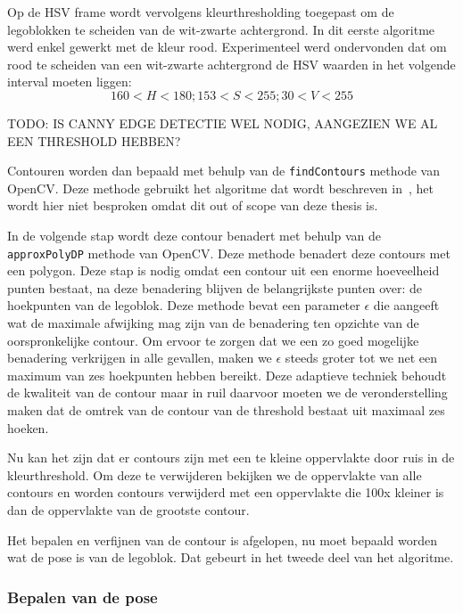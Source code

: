 Op de HSV frame wordt vervolgens kleurthresholding toegepast om de legoblokken te scheiden van de wit-zwarte achtergrond. In dit eerste algoritme werd enkel gewerkt met de kleur rood. Experimenteel werd ondervonden dat om rood te scheiden van een wit-zwarte achtergrond de HSV waarden in het volgende interval moeten liggen:
$$ 160 < H < 180; 153 < S < 255; 30 < V < 255$$

TODO: IS CANNY EDGE DETECTIE WEL NODIG, AANGEZIEN WE AL EEN THRESHOLD HEBBEN? %

Contouren worden dan bepaald met behulp van de \texttt{findContours} methode van OpenCV. Deze methode gebruikt het algoritme dat wordt beschreven in~\cite{suzuki1985topological}, het wordt hier niet besproken omdat dit out of scope van deze thesis is.

In de volgende stap wordt deze contour benadert met behulp van de \texttt{approxPolyDP} methode van OpenCV. Deze methode benadert deze contours met een polygon. Deze stap is nodig omdat een contour uit een enorme hoeveelheid punten bestaat, na deze benadering blijven de belangrijkste punten over: de hoekpunten van de legoblok. Deze methode bevat een parameter $\epsilon$ die aangeeft wat de maximale afwijking mag zijn van de benadering ten opzichte van de oorspronkelijke contour. Om ervoor te zorgen dat we een zo goed mogelijke benadering verkrijgen in alle gevallen, maken we $\epsilon$ steeds groter tot we net een maximum van zes hoekpunten hebben bereikt. Deze adaptieve techniek behoudt de kwaliteit van de contour maar in ruil daarvoor moeten we de veronderstelling maken dat de omtrek van de contour van de threshold bestaat uit maximaal zes hoeken.

Nu kan het zijn dat er contours zijn met een te kleine oppervlakte door ruis in de kleurthreshold. Om deze te verwijderen bekijken we de oppervlakte van alle contours en worden contours verwijderd met een oppervlakte die 100x kleiner is dan de oppervlakte van de grootste contour.

Het bepalen en verfijnen van de contour is afgelopen, nu moet bepaald worden wat de pose is van de legoblok. Dat gebeurt in het tweede deel van het algoritme.

\subsubsection*{Bepalen van de pose}




